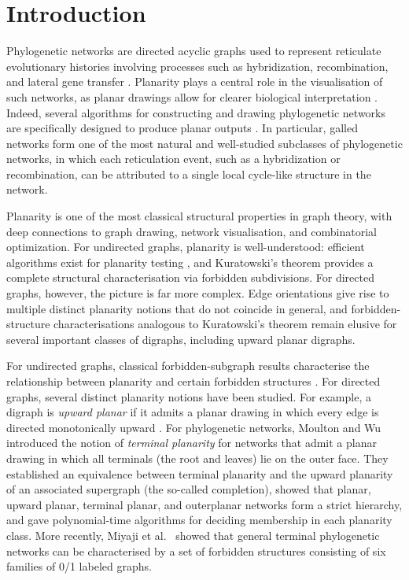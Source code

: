 \documentclass[pdflatex,sn-mathphys-num]{sn-jnl}
\theoremstyle{thmstyleone}%
\theoremstyle{thmstyletwo}%
\theoremstyle{thmstylethree}%
\begin{document}
\section{Introduction} \label{sec:intro}

Phylogenetic networks are directed acyclic graphs used to represent reticulate evolutionary histories involving processes such as hybridization, recombination, and lateral gene transfer \cite{Dress2010,HusonBook,Steel,KongEtAl,LinzWicke}. Planarity plays a central role in the visualisation of such networks, as planar drawings allow for clearer biological 
interpretation \cite{MoultonWu2022}. Indeed, several algorithms for constructing and drawing phylogenetic networks are specifically designed to produce planar outputs \cite{DressHuson2004, GambetteHuson2008, SpillnerNguyenMoulton2011}. In particular, galled networks \cite{HusonKlopper2007} form one of the most natural and well-studied subclasses of phylogenetic networks, in which each reticulation event, such as a hybridization or recombination, can be attributed to a single local cycle-like structure in the network.

Planarity is one of the most classical structural properties in graph theory, with deep connections to graph drawing, network visualisation, and combinatorial optimization. For undirected graphs, planarity is well-understood: efficient algorithms exist for planarity testing \cite{HoTa}, and Kuratowski's theorem \cite{Kuratowski} provides a complete structural characterisation via forbidden subdivisions. For directed graphs, however, the 
picture is far more complex. Edge orientations give rise to multiple distinct planarity notions that do not coincide in general, and forbidden-structure characterisations analogous to Kuratowski's theorem remain elusive for several important classes of digraphs, including upward planar digraphs.



For undirected graphs, classical forbidden-subgraph results characterise the relationship between planarity and certain forbidden structures \cite{Sys, Kuratowski}. For directed graphs, several distinct planarity notions have been studied. For example, a digraph is \emph{upward planar} if it admits a planar drawing in which every edge is directed monotonically upward \cite{HuLu, Thomassen1989, GaTa}. For phylogenetic networks,  Moulton and Wu \cite{MoultonWu2022} 
introduced the notion of \emph{terminal planarity} for networks that admit a planar drawing in which all terminals (the root and leaves) lie on the outer face. They established an equivalence between terminal planarity and the upward planarity of an associated supergraph (the so-called completion), showed that planar, upward planar, terminal planar, and outerplanar networks form a strict hierarchy, and gave polynomial-time algorithms for deciding membership in each planarity class. 
More recently, Miyaji et al.~\cite{Miyaji2026} showed that general terminal phylogenetic networks can be characterised by a set of forbidden structures consisting of six families of 0/1 labeled graphs.
\end{document}
